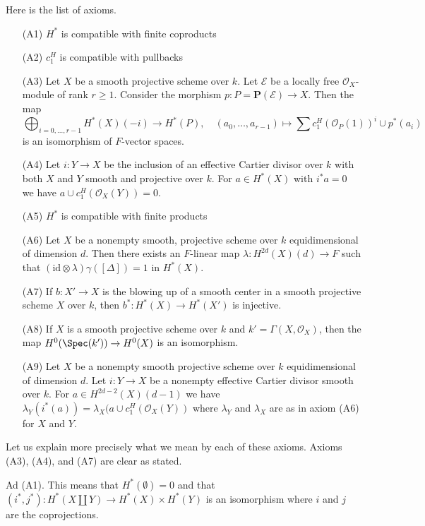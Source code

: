 \medskip\noindent
Here is the list of axioms.
\begin{enumerate}
\item[(A1)] $H^*$ is compatible with finite coproducts
\item[(A2)] $c_1^H$ is compatible with pullbacks
\item[(A3)] Let $X$ be a smooth projective scheme over $k$.
Let $\mathcal{E}$ be a locally free $\mathcal{O}_X$-module of rank $r \geq 1$.
Consider the morphism $p : P = \mathbf{P}(\mathcal{E}) \to X$.
Then the map
$$
\bigoplus\nolimits_{i = 0, \ldots, r - 1} H^*(X)(-i)
\longrightarrow H^*(P),\quad
(a_0, \ldots, a_{r - 1}) \longmapsto
\sum c_1^H(\mathcal{O}_P(1))^i \cup p^*(a_i)
$$
is an isomorphism of $F$-vector spaces.
\item[(A4)] Let $i : Y \to X$ be the inclusion of an effective
Cartier divisor over $k$ with both $X$ and $Y$ smooth and projective
over $k$. For $a \in H^*(X)$ with
$i^*a = 0$ we have $a \cup c_1^H(\mathcal{O}_X(Y)) = 0$.
\item[(A5)] $H^*$ is compatible with finite products
\item[(A6)] Let $X$ be a nonempty smooth, projective scheme over $k$
equidimensional of dimension $d$. Then there exists an
$F$-linear map $\lambda : H^{2d}(X)(d) \to F$ such that
$(\text{id} \otimes \lambda) \gamma([\Delta]) =  1$ in $H^*(X)$.
\item[(A7)] If $b : X' \to X$ is the blowing up of a smooth
center in a smooth projective scheme $X$ over $k$, then
$b^* : H^*(X) \to H^*(X')$ is injective.
\item[(A8)] If $X$ is a smooth projective scheme over $k$ and
$k' = \Gamma(X, \mathcal{O}_X)$, then the map $H^0(\Spec(k')) \to H^0(X)$
is an isomorphism.
\item[(A9)] Let $X$ be a nonempty smooth projective scheme over $k$
equidimensional of dimension $d$. Let $i : Y \to X$ be a nonempty
effective Cartier divisor smooth over $k$. For $a \in H^{2d - 2}(X)(d - 1)$
we have $\lambda_Y(i^*(a)) = \lambda_X(a \cup c_1^H(\mathcal{O}_X(Y))$ where
$\lambda_Y$ and $\lambda_X$ are as in axiom (A6) for $X$ and $Y$.
\end{enumerate}
Let us explain more precisely what we mean by each of these axioms.
Axioms (A3), (A4), and (A7) are clear as stated.

\medskip\noindent
Ad (A1). This means that $H^*(\emptyset) = 0$ and that
$(i^*, j^*) : H^*(X \amalg Y) \to H^*(X) \times H^*(Y)$
is an isomorphism where $i$ and $j$ are the coprojections.

